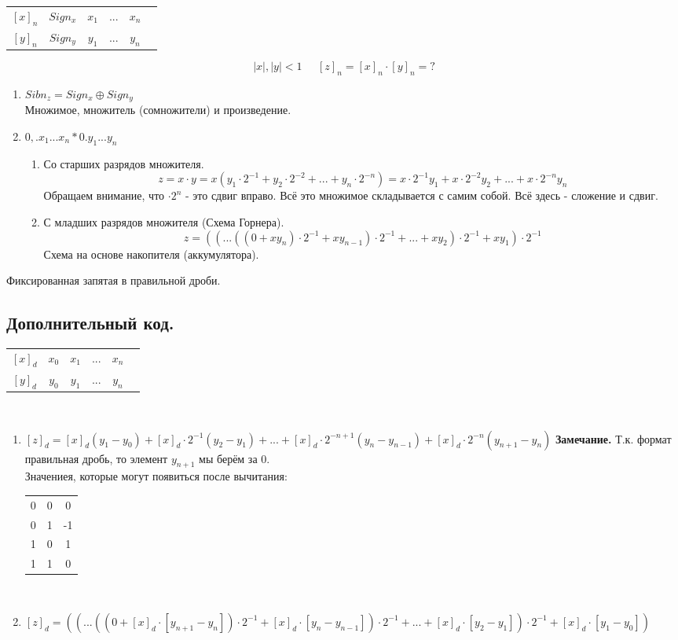 \documentclass[12px]{article}
\begin{document}
\begin{tabular}{c c c c c c}
	$[x]_n$ & $Sign_x$ & $x_1$ & ... & $x_n$\\
	$[y]_n$ & $Sign_y$ & $y_1$ & ... & $y_n$
\end{tabular}
\[ |x|, |y| < 1\;\;\;\;\; [z]_n = [x]_n \cdot [y]_n = ?\]
\begin{enumerate}
	\item $Sibn_z = Sign_x \oplus Sign_y$ \\ 
		Множимое, множитель (сомножители) и произведение. 
	\item $0,.  x_1 ... x_n * 0. y_1 ... y_n $\\
		\begin{enumerate}
			\item Со старших разрядов множителя.
				\[z = x \cdot y = x(y_1\cdot 2^{-1} +y_2\cdot 2^{-2} + ... + y_n\cdot 2^{-n} ) = x\cdot 2^{-1} y_1 + x \cdot 2^{-2} y_2 + ... + x \cdot 2^{-n} y_n\]
				Обращаем внимание, что $\cdot 2^n$ - это сдвиг вправо. Всё это множимое складывается с самим собой. Всё здесь - сложение и сдвиг. 
			\item С младших разрядов множителя (Схема Горнера). 
				\[ z = ((... ((0 + xy_n) \cdot 2^{-1} + xy_{n-1})\cdot 2^{-1} + ... + xy_2)\cdot 2^{-1} +  xy_1)\cdot 2^{-1} \]
				Схема на основе накопителя (аккумулятора). 

		\end{enumerate}
\end{enumerate}

Фиксированная запятая в правильной дроби. 
\subsection{Дополнительный код.}
\begin{tabular}{c c c c c c}
	$[x]_d$ & $x_0$ & $x_1$ & ... & $x_n$\\
	$[y]_d$ & $y_0$ & $y_1$ & ... & $y_n$
\end{tabular}\\
\begin{enumerate}
	\item 
$ [z]_d = [x]_d(y_1 - y_0) + [x]_d\cdot 2^{-1}(y_2-y_1) + ... + [x]_d\cdot 2^{-n+1}(y_n-y_{n-1}) + [x]_d\cdot 2^{-n}(y_{n+1}-y_n) $
\textbf{Замечание.} Т.к. формат правильная дробь, то элемент $y_{n+1}$ мы берём за 0.\\
Значениея, которые могут появиться после вычитания:\\
\begin{tabular}{c c c}
	0 & 0 & 0\\
	0 & 1 & -1\\
	1 & 0 & 1\\
	1 & 1 & 0
\end{tabular}\\ 
	\item $[z]_d = ((...((0 + [x]_d\cdot [y_{n + 1} - y_n])\cdot 2^{-1} + [x]_d \cdot [y_n - y_{n - 1}]) \cdot 2 ^{-1} + ... + [x]_d \cdot [y_2 - y_{1}]) \cdot 2 ^{-1} + [x]_d \cdot [y_1 - y_{0}])$

\end{enumerate}
\end{document}
